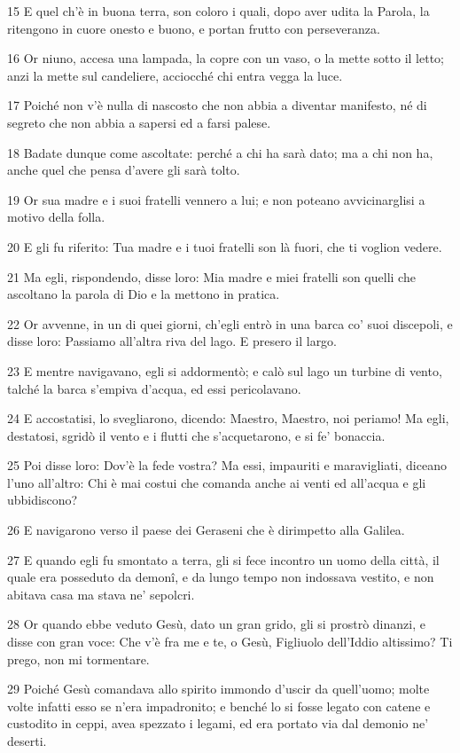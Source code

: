 \par 15 E quel ch'è in buona terra, son coloro i quali, dopo aver udita la Parola, la ritengono in cuore onesto e buono, e portan frutto con perseveranza.
\par 16 Or niuno, accesa una lampada, la copre con un vaso, o la mette sotto il letto; anzi la mette sul candeliere, acciocché chi entra vegga la luce.
\par 17 Poiché non v'è nulla di nascosto che non abbia a diventar manifesto, né di segreto che non abbia a sapersi ed a farsi palese.
\par 18 Badate dunque come ascoltate: perché a chi ha sarà dato; ma a chi non ha, anche quel che pensa d'avere gli sarà tolto.
\par 19 Or sua madre e i suoi fratelli vennero a lui; e non poteano avvicinarglisi a motivo della folla.
\par 20 E gli fu riferito: Tua madre e i tuoi fratelli son là fuori, che ti voglion vedere.
\par 21 Ma egli, rispondendo, disse loro: Mia madre e miei fratelli son quelli che ascoltano la parola di Dio e la mettono in pratica.
\par 22 Or avvenne, in un di quei giorni, ch'egli entrò in una barca co' suoi discepoli, e disse loro: Passiamo all'altra riva del lago. E presero il largo.
\par 23 E mentre navigavano, egli si addormentò; e calò sul lago un turbine di vento, talché la barca s'empiva d'acqua, ed essi pericolavano.
\par 24 E accostatisi, lo svegliarono, dicendo: Maestro, Maestro, noi periamo! Ma egli, destatosi, sgridò il vento e i flutti che s'acquetarono, e si fe' bonaccia.
\par 25 Poi disse loro: Dov'è la fede vostra? Ma essi, impauriti e maravigliati, diceano l'uno all'altro: Chi è mai costui che comanda anche ai venti ed all'acqua e gli ubbidiscono?
\par 26 E navigarono verso il paese dei Geraseni che è dirimpetto alla Galilea.
\par 27 E quando egli fu smontato a terra, gli si fece incontro un uomo della città, il quale era posseduto da demonî, e da lungo tempo non indossava vestito, e non abitava casa ma stava ne' sepolcri.
\par 28 Or quando ebbe veduto Gesù, dato un gran grido, gli si prostrò dinanzi, e disse con gran voce: Che v'è fra me e te, o Gesù, Figliuolo dell'Iddio altissimo? Ti prego, non mi tormentare.
\par 29 Poiché Gesù comandava allo spirito immondo d'uscir da quell'uomo; molte volte infatti esso se n'era impadronito; e benché lo si fosse legato con catene e custodito in ceppi, avea spezzato i legami, ed era portato via dal demonio ne' deserti.
